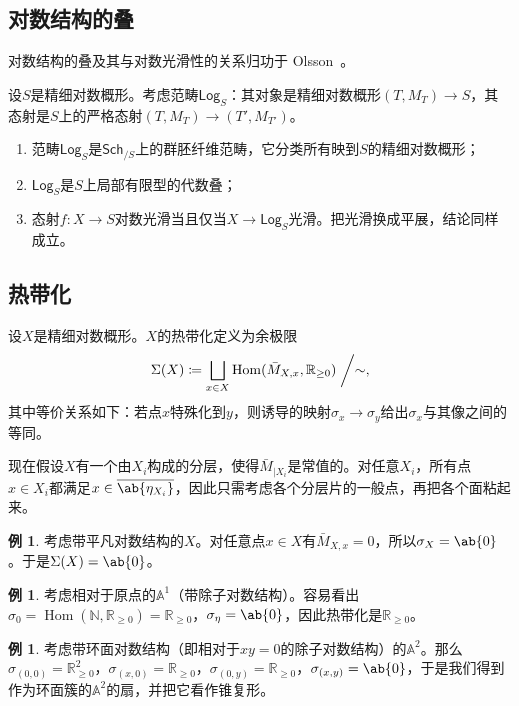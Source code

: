 \documentclass{amsart}
\theoremstyle{definition}
\newtheorem{exm}[thm]{例}
\theoremstyle{remark}
\theoremstyle{plain}
\theoremstyle{definition}
\theoremstyle{remark}
\newcommand{\A}{\mathbb{A}}
\newcommand{\N}{\mathbb{N}}
\newcommand{\R}{\mathbb{R}}
\newcommand{\ms}[1]{\mathsf{#1}}
\newcommand{\ol}[1]{\overline{#1}}
\newcommand{\1}{\mathbf{1}}
\newcommand{\2}{\mathbf{2}}
\newcommand{\3}{\mathbf{3}}
\DeclareMathOperator{\Hom}{Hom}
\begin{document}
\subsection{对数结构的叠}%
\label{sub:Stack of log structures}

对数结构的叠及其与对数光滑性的关系归功于 Olsson~\cite{Olsson2003}。

设\(S\)是精细对数概形。考虑范畴\(\ms{Log}_S\)：其对象是精细对数概形\((T, M_T) \to S\)，其态射是\(S\)上的严格态射\((T, M_T) \to (T', M_{T'})\)。
\begin{enumerate}
    \item 范畴\(\ms{Log}_S\)是\(\ms{Sch}_{/S}\)上的群胚纤维范畴，它分类所有映到\(S\)的精细对数概形；
    \item \(\ms{Log}_S\)是\(S\)上局部有限型的代数叠；
    \item 态射\(f \colon X \to S\)对数光滑当且仅当\(X \to \ms{Log}_S\)光滑。把光滑换成平展，结论同样成立。
\end{enumerate}

\subsection{热带化}%
\label{sub:Tropicalization}

设\(X\)是精细对数概形。\(X\)的热带化定义为余极限
\[\Sigma(X) \coloneqq \bigsqcup_{x \in X} \Hom(\bar{M}_{X,x}, \R_{\geq 0}) \biggm/ \sim, \]
其中等价关系如下：若点\(x\)特殊化到\(y\)，则诱导的映射\(\sigma_x \to \sigma_y\)给出\(\sigma_x\)与其像之间的等同。

现在假设\(X\)有一个由\(X_i\)构成的分层，使得\(\bar{M}_{|X_i}\)是常值的。对任意\(X_i\)，所有点\(x \in X_i\)都满足\(x \in \ol{\ab\{\eta_{X_i}\}}\)，因此只需考虑各个分层片的一般点，再把各个面粘起来。

\begin{exm}
    考虑带平凡对数结构的\(X\)。对任意点\(x \in X\)有\(\bar{M}_{X,x} = 0\)，所以\(\sigma_X = \ab\{0\}\)。于是\(\Sigma(X) = \ab\{0\}\)。
\end{exm}

\begin{exm}
    考虑相对于原点的\(\A^1\)（带除子对数结构）。容易看出\(\sigma_0 = \Hom(\N, \R_{\geq 0}) = \R_{\geq 0}\)，\(\sigma_{\eta} = \ab\{0\}\)，因此热带化是\(\R_{\geq 0}\)。
\end{exm}

\begin{exm}
    考虑带环面对数结构（即相对于\(xy = 0\)的除子对数结构）的\(\A^2\)。那么\(\sigma_{(0,0)} = \R^2_{\geq 0}\)，\(\sigma_{(x,0)} = \R_{\geq 0}\)，\(\sigma_{(0,y)} = \R_{\geq 0}\)，\(\sigma_{(x,y)} = \ab\{0\}\)，于是我们得到作为环面簇的\(\A^2\)的扇，并把它看作锥复形。
\end{exm}
\end{document}

